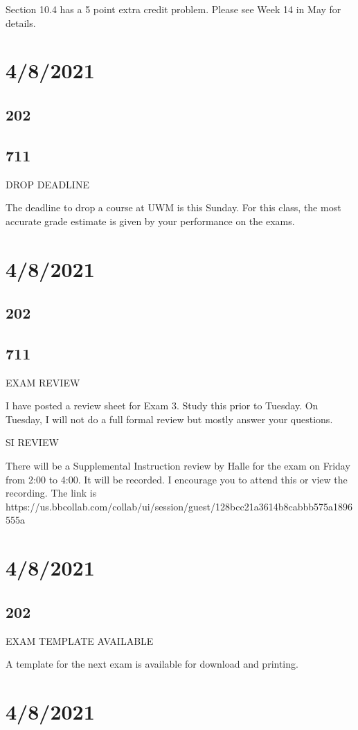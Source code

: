 \documentclass[]{article}
\begin{document}
Section 10.4 has a 5 point extra credit problem. Please see Week 14 in May for details.

\section*{4/8/2021}
\subsection*{202}
\subsection*{711}
DROP DEADLINE

The deadline to drop a course at UWM is this Sunday. For this class, the most accurate grade estimate is given by your performance on the exams.

\section*{4/8/2021}
\subsection*{202}
\subsection*{711}
EXAM REVIEW

I have posted a review sheet for Exam 3. Study this prior to Tuesday. On Tuesday, I will not do a full formal review but mostly answer your questions.

SI REVIEW

There will be a Supplemental Instruction review by Halle for the exam on Friday from 2:00 to 4:00. It will be recorded. I encourage you to attend this or view the recording. The link is https://us.bbcollab.com/collab/ui/session/guest/128bcc21a3614b8cabbb575a1896555a

\section*{4/8/2021}
\subsection*{202}
EXAM TEMPLATE AVAILABLE

A template for the next exam is available for download and printing.

\section*{4/8/2021}
\end{document}

